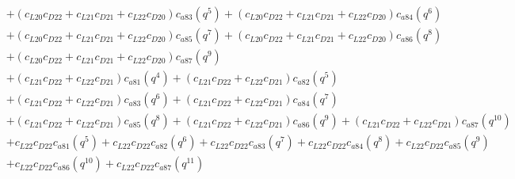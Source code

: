 \documentclass[12pt]{article}
\begin{document}
\begin{align}
    &+ (c_{L20}c_{D22} + c_{L21}c_{D21} + c_{L22}c_{D20})c_{a83}(q^5) + (c_{L20}c_{D22} + c_{L21}c_{D21} + c_{L22}c_{D20})c_{a84}(q^6) \nonumber\\
    &+ (c_{L20}c_{D22} + c_{L21}c_{D21} + c_{L22}c_{D20})c_{a85}(q^7) + (c_{L20}c_{D22} + c_{L21}c_{D21} + c_{L22}c_{D20})c_{a86}(q^8) \nonumber\\
    &+ (c_{L20}c_{D22} + c_{L21}c_{D21} + c_{L22}c_{D20})c_{a87}(q^9)  \nonumber\\
    &+  (c_{L21}c_{D22} + c_{L22}c_{D21})c_{a81}(q^4) + (c_{L21}c_{D22} + c_{L22}c_{D21})c_{a82}(q^5) \nonumber\\
    &+ (c_{L21}c_{D22} + c_{L22}c_{D21})c_{a83}(q^6) + (c_{L21}c_{D22} + c_{L22}c_{D21})c_{a84}(q^7) \nonumber\\
    &+ (c_{L21}c_{D22} + c_{L22}c_{D21})c_{a85}(q^8) + (c_{L21}c_{D22} + c_{L22}c_{D21})c_{a86}(q^9) + (c_{L21}c_{D22} + c_{L22}c_{D21})c_{a87}(q^{10})  \nonumber\\
    &+  c_{L22}c_{D22}c_{a81}(q^5) + c_{L22}c_{D22}c_{a82}(q^6) + c_{L22}c_{D22}c_{a83}(q^7) + c_{L22}c_{D22}c_{a84}(q^8) + c_{L22}c_{D22}c_{a85}(q^9) \nonumber\\
    &+ c_{L22}c_{D22}c_{a86}(q^{10}) + c_{L22}c_{D22}c_{a87}(q^{11})
\end{align}
\end{document}

